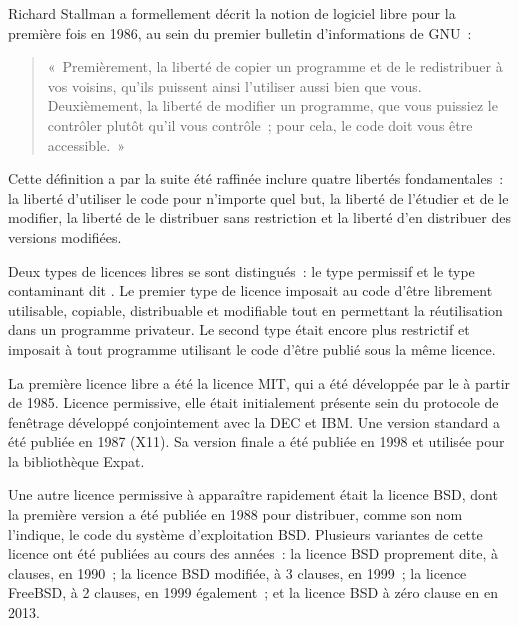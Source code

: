 Richard Stallman a formellement décrit la notion de logiciel libre pour la première fois en 1986, au sein du premier bulletin d'informations de GNU~:

\begin{quote}
«~Premièrement, la liberté de copier un programme et de le redistribuer à vos voisins, qu'ils puissent ainsi l'utiliser aussi bien que vous. Deuxièmement, la liberté de modifier un programme, que vous puissiez le contrôler plutôt qu'il vous contrôle~; pour cela, le code doit vous être accessible.~»
\end{quote}

Cette définition a par la suite été raffinée inclure quatre libertés fondamentales~: la liberté d'utiliser le code pour n'importe quel but, la liberté de l'étudier et de le modifier, la liberté de le distribuer sans restriction et la liberté d'en distribuer des versions modifiées.

Deux types de licences libres se sont distingués~: le type permissif et le type contaminant dit . Le premier type de licence imposait au code d'être librement utilisable, copiable, distribuable et modifiable tout en permettant la réutilisation dans un programme privateur. Le second type était encore plus restrictif et imposait à tout programme utilisant le code d'être publié sous la même licence.

La première licence libre a été la licence MIT, qui a été développée par le  à partir de 1985. Licence permissive, elle était initialement présente sein du protocole de fenêtrage  développé conjointement avec la DEC et IBM. Une version standard a été publiée en 1987 (X11). Sa version finale a été publiée en 1998 et utilisée pour la bibliothèque Expat.

Une autre licence permissive à apparaître rapidement était la licence BSD, dont la première version a été publiée en 1988 pour distribuer, comme son nom l'indique, le code du système d'exploitation BSD. Plusieurs variantes de cette licence ont été publiées au cours des années~: la licence BSD proprement dite, à  clauses, en 1990~; la licence BSD modifiée, à 3 clauses, en 1999~; la licence FreeBSD, à 2 clauses, en 1999 également~; et la licence BSD à zéro clause en en 2013.

